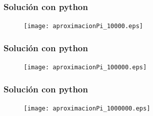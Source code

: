 \begin{frame}
\frametitle{Solución con python}
\begin{figure}
  \centering
  \texttt{[image: aproximacionPi\_10000.eps]}
\end{figure}
\end{frame}
\begin{frame}
\frametitle{Solución con python}
\begin{figure}
  \centering
  \texttt{[image: aproximacionPi\_100000.eps]}
\end{figure}
\end{frame}
\begin{frame}
\frametitle{Solución con python}
\begin{figure}
  \centering
  \texttt{[image: aproximacionPi\_1000000.eps]}
\end{figure}
\end{frame}
